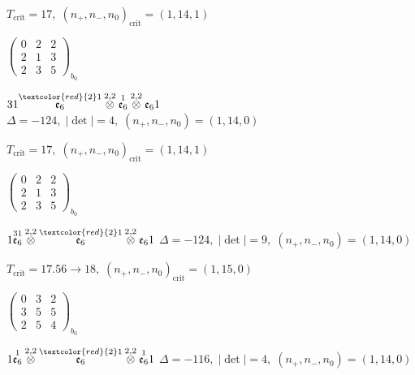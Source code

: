 \documentclass[10pt]{article}
\begin{document}
\hspace{1em}$T_{\text{crit}}=17,\; (n_+,n_-,n_0)_{\text{crit}}=(1,14,1)$

\hspace{2em}$\left(\begin{smallmatrix}0 & 2 & 2 \\ 2 & 1 & 3 \\ 2 & 3 & 5\end{smallmatrix}\right)_{\!b_0}$

\smallskip

$31\overset{\textcolor{red}{2}1}{\mathfrak{e}_6}\overset{2,2}{\otimes}\overset{1}{\mathfrak{e}_6}\overset{2,2}{\otimes}\mathfrak{e}_61$ \quad $\Delta=-124,\; |\det|=4,\; (n_+,n_-,n_0)=(1,14,0)$

\hspace{1em}$T_{\text{crit}}=17,\; (n_+,n_-,n_0)_{\text{crit}}=(1,14,1)$

\hspace{2em}$\left(\begin{smallmatrix}0 & 2 & 2 \\ 2 & 1 & 3 \\ 2 & 3 & 5\end{smallmatrix}\right)_{\!b_0}$

$1\overset{31}{\mathfrak{e}_6}\overset{2,2}{\otimes}\overset{\textcolor{red}{2}1}{\mathfrak{e}_6}\overset{2,2}{\otimes}\mathfrak{e}_61$ \quad $\Delta=-124,\; |\det|=9,\; (n_+,n_-,n_0)=(1,14,0)$

\hspace{1em}$T_{\text{crit}}=17.56 \to 18,\; (n_+,n_-,n_0)_{\text{crit}}=(1,15,0)$

\hspace{2em}$\left(\begin{smallmatrix}0 & 3 & 2 \\ 3 & 5 & 5 \\ 2 & 5 & 4\end{smallmatrix}\right)_{\!b_0}$

\smallskip

$1\overset{1}{\mathfrak{e}_6}\overset{2,2}{\otimes}\overset{\textcolor{red}{2}1}{\mathfrak{e}_6}\overset{2,2}{\otimes}\overset{1}{\mathfrak{e}_6}1$ \quad $\Delta=-116,\; |\det|=4,\; (n_+,n_-,n_0)=(1,14,0)$
\end{document}
